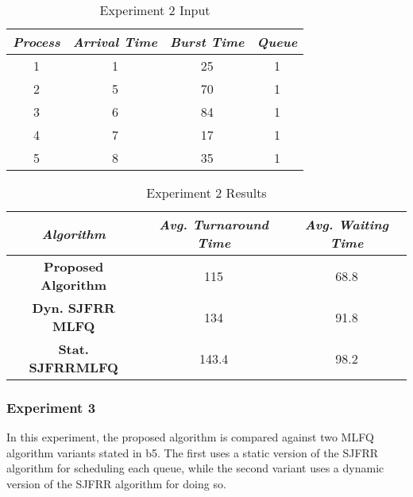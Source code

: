 \documentclass[conference]{IEEEtran}
\newcommand\T{\rule{0pt}{2.6ex}}       %
\newcommand\B{\rule[-1.2ex]{0pt}{0pt}} %
\begin{document}
\begin{table}[H]
    \caption{Experiment 2 Input}
    \centering
     \begin{tabular}{||c c c c||} 
     \hline
     \textit{\textbf{Process}} & \textit{\textbf{Arrival Time}} & \textit{\textbf{Burst Time}} & \textit{\textbf{Queue}} \T \B \\ 
     \hline
     \hline
     1 & 1 & 25 & 1 \T \B \\ 
     \hline
     2 & 5 & 70 & 1 \T \B \\
     \hline
     3 & 6 & 84 & 1 \T \B \\
     \hline
     4 & 7 & 17 & 1 \T \B \\
     \hline
     5 & 8 & 35 & 1 \T \B \\ 
     \hline
     \end{tabular}
\end{table}

\begin{table}[H]
    \caption{Experiment 2 Results}
    \centering
    \begin{tabular}{||c c c||}
        \hline
        \textit{\textbf{Algorithm}} & \textit{\textbf{Avg. Turnaround Time}} & \textit{\textbf{Avg. Waiting Time}}\T \B \\
    \hline
    \hline
    \textbf{Proposed Algorithm} & 115 & 68.8 \T \B\\ \hline
    \textbf{Dyn. SJFRR MLFQ} & 134 & 91.8\T \B\\ \hline
    \textbf{Stat. SJFRRMLFQ} & 143.4 & 98.2 \T \B\\ \hline
     \end{tabular}
\end{table}

\subsubsection{Experiment 3}

In this experiment, the proposed algorithm is compared against two MLFQ algorithm variants stated in {b5}. The first uses a static version of the SJFRR algorithm for scheduling each queue, while the second variant uses a dynamic version of the SJFRR algorithm for doing so.
\end{document}

